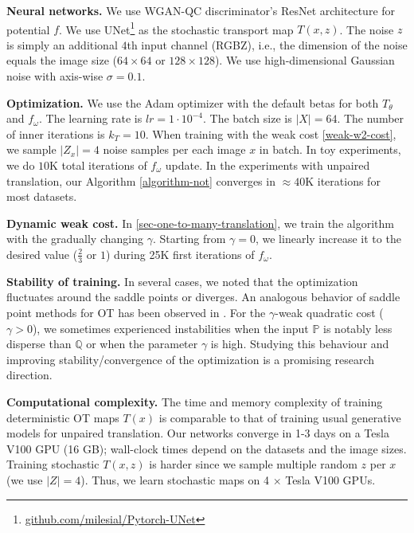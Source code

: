 \documentclass{article} %
\begin{document}
\vspace{-0.5mm}\textbf{Neural networks.} We use WGAN-QC discriminator's ResNet architecture \citep{liu2019wasserstein} for potential $f$. We use UNet\footnote{\url{github.com/milesial/Pytorch-UNet}} \citep{ronneberger2015u} as the stochastic transport map $T(x,z)$. The noise $z$ is simply an additional $4$th input channel (RGBZ), i.e., the dimension of the noise equals the image size ($64\times 64$ or $128\times 128$). We use high-dimensional Gaussian noise with axis-wise $\sigma=0.1$.
 
\textbf{Optimization.} We use the Adam optimizer \citep{kingma2014adam} with the default betas for both $T_{\theta}$ and $f_{\omega}$. The learning rate is $lr=1\cdot 10^{-4}$. The batch size is $|X|=64$. The number of inner iterations is $k_{T}=10$. When training with the weak cost \eqref{weak-w2-cost}, we sample $|Z_x|=4$ noise samples per each image $x$ in batch. In toy experiments, we do $10$K total iterations of $f_{\omega}$ update. In the experiments with unpaired translation, our Algorithm \ref{algorithm-not} converges in $\approx 40$K iterations for most datasets. 

\textbf{Dynamic weak cost.} In \wasyparagraph\ref{sec-one-to-many-translation}, we train the algorithm with the gradually changing $\gamma$. Starting from $\gamma=0$, we linearly increase it to the desired value ($\frac{2}{3}$ or $1$) during 25K first iterations of $f_{\omega}$.


\textbf{Stability of training.} In several cases, we noted that the optimization fluctuates around the saddle points or diverges. An analogous behavior of saddle point methods for OT has been observed in \citep{korotin2021neural}. For the $\gamma$-weak quadratic cost ($\gamma>0$), we sometimes experienced instabilities when the input $\mathbb{P}$ is notably less disperse than $\mathbb{Q}$ or when the parameter $\gamma$ is high. Studying this behaviour and improving stability/convergence of the optimization is a promising research direction.

\textbf{Computational complexity.} The time and memory complexity of training deterministic OT maps $T(x)$ is comparable to that of training usual generative models for unpaired translation. Our networks converge in 1-3 days on a Tesla V100 GPU (16 GB); wall-clock times depend on the datasets and the image sizes. Training stochastic $T(x,z)$ is harder since we sample multiple random $z$ per $x$ (we use $|Z|=4$). Thus, we learn stochastic maps on 4 $\times$ Tesla V100 GPUs.
\end{document}
